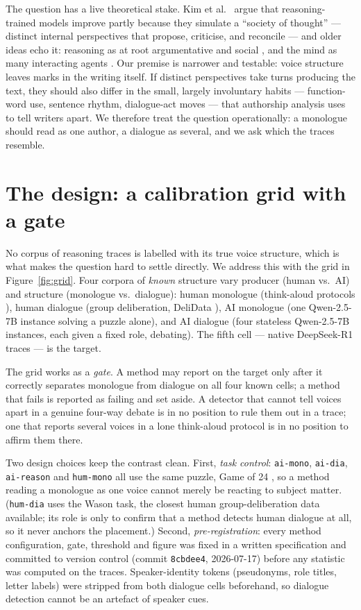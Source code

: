 \documentclass[10pt,twocolumn]{article}
\begin{document}
The question has a live theoretical stake. Kim et al.~\cite{kim2026} argue that reasoning-trained
models improve partly because they simulate a ``society of thought'' --- distinct internal
perspectives that propose, criticise, and reconcile --- and older ideas echo it: reasoning as at
root argumentative and social \cite{mercier2017}, and the mind as many interacting agents
\cite{minsky1986}. Our premise is narrower and testable: voice structure leaves marks in the
writing itself. If distinct perspectives take turns producing the text, they should also differ in
the small, largely involuntary habits --- function-word use, sentence rhythm, dialogue-act moves
--- that authorship analysis uses to tell writers apart. We therefore treat the question
operationally: a monologue should read as one author, a dialogue as several, and we ask which the
traces resemble.

\section{The design: a calibration grid with a gate}
No corpus of reasoning traces is labelled with its true voice structure, which is what makes the
question hard to settle directly. We address this with the grid in Figure~\ref{fig:grid}. Four
corpora of \emph{known} structure vary producer (human vs.\ AI) and structure (monologue vs.\
dialogue): human monologue (think-aloud protocols \cite{wurgaft2025}), human dialogue (group
deliberation, DeliData \cite{karadzhov2023}), AI monologue (one Qwen-2.5-7B instance solving a
puzzle alone), and AI dialogue (four stateless Qwen-2.5-7B instances, each given a fixed role,
debating). The fifth cell --- native DeepSeek-R1 traces --- is the target.

The grid works as a \emph{gate}. A method may report on the target only after it correctly
separates monologue from dialogue on all four known cells; a method that fails is reported as
failing and set aside. A detector that cannot tell voices apart in a genuine four-way debate is in
no position to rule them out in a trace; one that reports several voices in a lone think-aloud
protocol is in no position to affirm them there.

Two design choices keep the contrast clean. First, \emph{task control}: \texttt{ai-mono},
\texttt{ai-dia}, \texttt{ai-reason} and \texttt{hum-mono} all use the same puzzle, Game of 24
\cite{yao2023}, so a method reading a monologue as one voice cannot merely be reacting to subject
matter. (\texttt{hum-dia} uses the Wason task, the closest human group-deliberation data available;
its role is only to confirm that a method detects human dialogue at all, so it never anchors the
placement.) Second, \emph{pre-registration}: every method configuration, gate, threshold and figure
was fixed in a written specification and committed to version control (commit \texttt{8cbdee4},
2026-07-17) before any statistic was computed on the traces. Speaker-identity tokens
(pseudonyms, role titles, letter labels) were stripped from both dialogue cells beforehand, so
dialogue detection cannot be an artefact of speaker cues.
\end{document}

